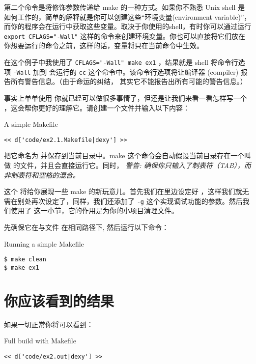 第二个命令是将修饰参数传递给 make 的一种方式。如果你不熟悉 Unix shell 是如何工作的，简单的解释就是你可以创建这些“环境变量(environment variable)”，而你的程序会在运行中获取这些变量。取决于你使用的shell，有时你可以通过运行 \verb|export CFLAGS="-Wall"| 这样的命令来创建环境变量。你也可以直接将它们放在你想要运行的命令之前，这样的话，变量将只在当前命令中生效。

在这个例子中我使用了 \verb|CFLAGS="-Wall" make ex1| ，结果就是 shell 将命令行选项 \verb|-Wall| 加到  会运行的 \verb|cc| 这个命令中。该命令行选项将让编译器 (compiler)  报告所有警告信息。（由于命运的纠结， 其实它不能报告出所有可能的警告信息。）

事实上单单使用  你就已经可以做很多事情了，但还是让我们来看一看怎样写一个  ，这会帮你更好的理解它。请创建一个文件并输入以下内容：

\begin{code}{A simple Makefile}
\begin{lstlisting}
<< d['code/ex2.1.Makefile|dexy'] >>
\end{lstlisting}
\end{code}

把它命名为  并保存到当前目录中。make 这个命令会自动假设当前目录存在一个叫做  的文件，并且会直接运行它。同时， \emph{警告: 确保你只输入了制表符（TAB），而非制表符和空格的混合。}

这个  将给你展现一些 make 的新玩意儿。首先我们在里边设定好 ，这样我们就无需在别处再次设定了，同样，我们还添加了 \verb|-g| 这个实现调试功能的参数。然后我们使用了  这一小节，它的作用是为你的小项目清理文件。

先确保它在与文件  在相同路径下, 然后运行以下命令：

\begin{Terminal}{Running a simple Makefile}
\begin{lstlisting}
$ make clean
$ make ex1
\end{lstlisting}
\end{Terminal}


\section{你应该看到的结果}

如果一切正常你将可以看到：

\begin{Terminal}{Full build with Makefile}
\begin{lstlisting}
<< d['code/ex2.out|dexy'] >>
\end{lstlisting}
\end{Terminal}

